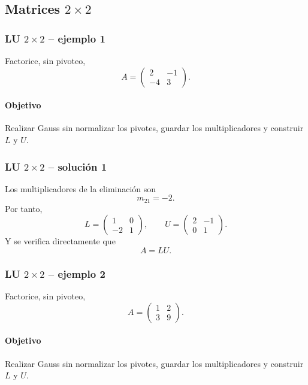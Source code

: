 \subsection{Matrices $2\times 2$}

\subsubsection*{LU $2\times 2$ -- ejemplo 1}

Factorice, sin pivoteo,
\[
A=\begin{pmatrix}2 & -1\\-4 & 3\end{pmatrix}.
\]

\paragraph{Objetivo}
Realizar Gauss sin normalizar los pivotes, guardar los multiplicadores y construir $L$ y $U$.



\subsubsection*{LU $2\times 2$ -- solución 1}

Los multiplicadores de la eliminación son
\[
m_{21}=-2.
\]
Por tanto,
\[
L=\begin{pmatrix}1 & 0\\-2 & 1\end{pmatrix},\qquad U=\begin{pmatrix}2 & -1\\0 & 1\end{pmatrix}.
\]
Y se verifica directamente que
\[
\boxed{A=LU}.
\]


\subsubsection*{LU $2\times 2$ -- ejemplo 2}

Factorice, sin pivoteo,
\[
A=\begin{pmatrix}1 & 2\\3 & 9\end{pmatrix}.
\]

\paragraph{Objetivo}
Realizar Gauss sin normalizar los pivotes, guardar los multiplicadores y construir $L$ y $U$.



